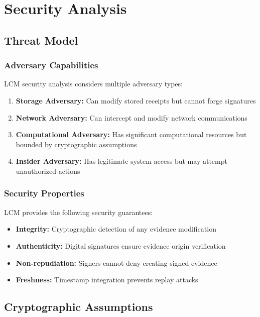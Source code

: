 \documentclass[12pt,a4paper]{article}
\begin{document}
\section{Security Analysis}

\subsection{Threat Model}

\subsubsection{Adversary Capabilities}

LCM security analysis considers multiple adversary types:

\begin{enumerate}
\item \textbf{Storage Adversary:} Can modify stored receipts but cannot forge signatures
\item \textbf{Network Adversary:} Can intercept and modify network communications
\item \textbf{Computational Adversary:} Has significant computational resources but bounded by cryptographic assumptions
\item \textbf{Insider Adversary:} Has legitimate system access but may attempt unauthorized actions
\end{enumerate}

\subsubsection{Security Properties}

LCM provides the following security guarantees:

\begin{itemize}
\item \textbf{Integrity:} Cryptographic detection of any evidence modification
\item \textbf{Authenticity:} Digital signatures ensure evidence origin verification
\item \textbf{Non-repudiation:} Signers cannot deny creating signed evidence
\item \textbf{Freshness:} Timestamp integration prevents replay attacks
\end{itemize}

\subsection{Cryptographic Assumptions}
\end{document}
